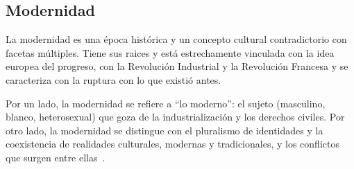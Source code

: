 \begin{comment}
* "diálogo en tensión entre lo local y lo global[..], entre lo rural y lo urbano, entre lo oral y lo letrado, lo nacional y lo regional"~\cite{SzIr2009}{p.73}

# campo cultural

* Bourdieu!
* segun Bourdieu: "un campo es un sistema de posiciones individuales (caracterizadas por el habitus de sus miembros) que se definen por la estructura y la cantidad del capital que se posee" ~\cite{SzIr2009}{p.48}
* un conjunto de límites, creencias y prácticas
* negocia las relaciones entre grupos: "La idea de campo permite estudiar ya no sólo las dinámicas de la cultura como bien de la élite, sino las dinámicas de las diferentes culturas que disputan la hegemonía"~\cite{SzIr2009}{p.48}
* lugar de conflicto y mecanismo de poder
* capital
  * económico - trabajo, tierras, patrimonios
  * cultural - conocimientos, calificaciones <- define las relaciones en el campo cultural
  * social - amigos, redes,
  * simbólico - reputación, prestigio

* cómo se tracen los límites del campo? quién decide?
* actores del campo cultural: "el intelectual" (nótase el artículo masculino), "el artista": quines son? cuál es su papel en la construcción de la nación?
* el poder/privilegio se han de ver en relación, no en vacuum (algunos pueden ser privilegiados en respeto a otr@s y menos privilegiad@s en respeto a un tercer grupo)
* "Las instituciones son la configuración de relaciones entre actores individuales y colectivos."~\cite{SzIr2009}{p.49}
\end{comment}


\subsection{Modernidad}

La modernidad es una época histórica y un concepto cultural contradictorio con facetas múltiples.
Tiene sus raices y está estrechamente vinculada con la idea europea del progreso, con la Revolución Industrial y la Revolución Francesa y se caracteriza con la ruptura con lo que existió antes.

Por un lado, la modernidad se refiere a ``lo moderno'': el sujeto (masculino, blanco, heterosexual) que goza de la industrialización y los derechos civiles.
Por otro lado, la modernidad se distingue con el pluralismo de identidades y la coexistencia de realidades culturales, modernas y tradicionales, y los conflictos que surgen entre ellas~\autocite[177]{SzIr2009}.


